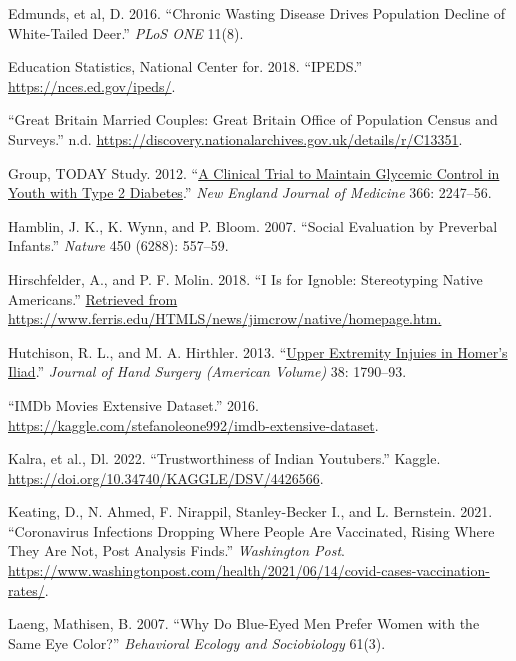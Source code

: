 \documentclass[
]{report}
\newlength{\cslhangindent}
\newenvironment{CSLReferences}[2] %
 {\begin{list}{}{%
  \setlength{\itemindent}{0pt}
  \setlength{\leftmargin}{0pt}
  \setlength{\parsep}{0pt}
  \ifodd #1
   \setlength{\leftmargin}{\cslhangindent}
   \setlength{\itemindent}{-1\cslhangindent}
  \fi
  \setlength{\itemsep}{#2\baselineskip}}}
 {\end{list}}
\begin{document}
\begin{CSLReferences}{1}{0}
Edmunds, et al, D. 2016. {``Chronic Wasting Disease Drives Population Decline of White-Tailed Deer.''} \emph{PLoS ONE} 11(8).

Education Statistics, National Center for. 2018. {``IPEDS.''} \url{https://nces.ed.gov/ipeds/}.

{``Great Britain Married Couples: Great Britain Office of Population Census and Surveys.''} n.d. \url{https://discovery.nationalarchives.gov.uk/details/r/C13351}.

Group, TODAY Study. 2012. {``\href{https://www.ncbi.nlm.nih.gov/pubmed/22540912}{A Clinical Trial to Maintain Glycemic Control in Youth with Type 2 Diabetes}.''} \emph{New England Journal of Medicine} 366: 2247--56.

Hamblin, J. K., K. Wynn, and P. Bloom. 2007. {``Social Evaluation by Preverbal Infants.''} \emph{Nature} 450 (6288): 557--59.

Hirschfelder, A., and P. F. Molin. 2018. {``I Is for Ignoble: Stereotyping Native Americans.''} \href{Retrieved\%20from\%20https://www.ferris.edu/HTMLS/news/jimcrow/native/homepage.htm.}{Retrieved from https://www.ferris.edu/HTMLS/news/jimcrow/native/homepage.htm.}

Hutchison, R. L., and M. A. Hirthler. 2013. {``\href{https://www.ncbi.nlm.nih.gov/pubmed/23932117}{Upper Extremity Injuies in Homer's Iliad}.''} \emph{Journal of Hand Surgery (American Volume)} 38: 1790--93.

{``{IMDb} Movies Extensive Dataset.''} 2016. \url{https://kaggle.com/stefanoleone992/imdb-extensive-dataset}.

Kalra, et al., Dl. 2022. {``Trustworthiness of Indian Youtubers.''} Kaggle. \url{https://doi.org/10.34740/KAGGLE/DSV/4426566}.

Keating, D., N. Ahmed, F. Nirappil, Stanley-Becker I., and L. Bernstein. 2021. {``Coronavirus Infections Dropping Where People Are Vaccinated, Rising Where They Are Not, Post Analysis Finds.''} \emph{Washington Post}. \url{https://www.washingtonpost.com/health/2021/06/14/covid-cases-vaccination-rates/}.

Laeng, Mathisen, B. 2007. {``Why Do Blue-Eyed Men Prefer Women with the Same Eye Color?''} \emph{Behavioral Ecology and Sociobiology} 61(3).


\end{CSLReferences}
\end{document}

